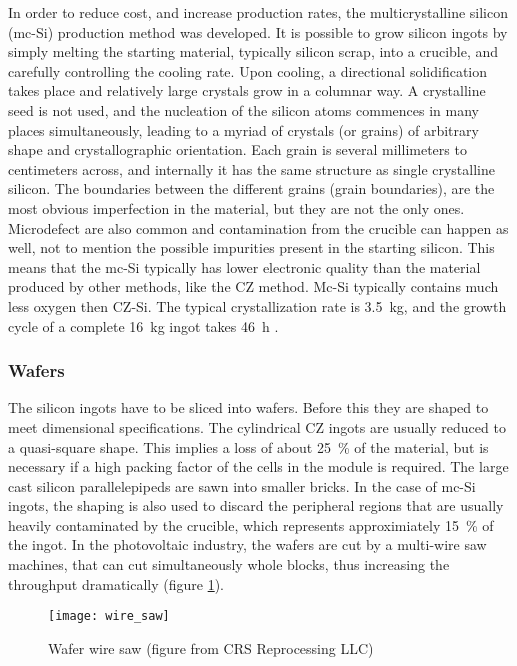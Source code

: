 In order to reduce cost, and increase production rates, the multicrystalline silicon (mc-Si) production method was developed. It is possible to grow silicon ingots by simply melting the starting material, typically silicon scrap, into a crucible, and carefully controlling the cooling rate. Upon cooling, a directional solidification takes place and relatively large crystals grow in a columnar way. A crystalline seed is not used, and the nucleation of the silicon atoms commences in many places simultaneously, leading to a myriad of crystals (or grains) of arbitrary shape and crystallographic orientation. Each grain is several millimeters to centimeters across, and internally it has the same structure as single crystalline silicon. The boundaries between the different grains (grain boundaries), are the most obvious imperfection in the material, but they are not the only ones. Microdefect are also common and contamination from the crucible can happen as well, not to mention the possible impurities present in the starting silicon. This means that the mc-Si typically has lower electronic quality than the material produced by other methods, like the CZ method. Mc-Si typically contains much less oxygen then CZ-Si. The typical crystallization rate is 3.5~kg, and the growth cycle of a complete 16~kg ingot takes 46~h \cite{solar_cells}. 

\subsubsection{Wafers}

The silicon ingots have to be sliced into wafers. Before this they are shaped to meet dimensional specifications. The cylindrical CZ ingots are usually reduced to a quasi-square shape. This implies a loss of about 25~\% of the material, but is necessary if a high packing factor of the cells in the module is required. The large cast silicon parallelepipeds are sawn into smaller bricks. In the case of mc-Si ingots, the shaping is also used to discard the peripheral regions that are usually heavily contaminated by the crucible, which represents approximiately 15~\% of the ingot. In the photovoltaic industry, the wafers are cut by a multi-wire saw machines, that can cut simultaneously whole blocks, thus increasing the throughput dramatically (figure \ref{fig:wire_saw}).

\begin{figure}%
\texttt{[image: wire\_saw]}%
\caption{Wafer wire saw (figure from CRS Reprocessing LLC)}%
\label{fig:wire_saw}%
\end{figure}

